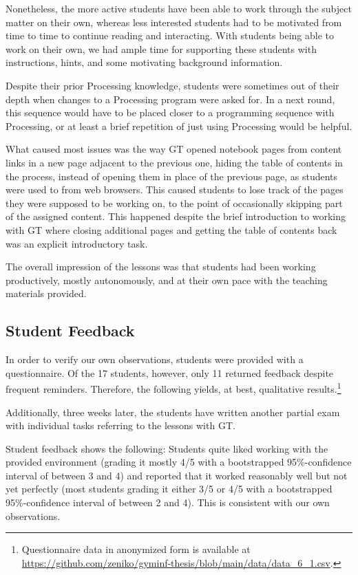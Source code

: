 Nonetheless, the more active students have been able to work through the subject matter on their own, whereas less interested students had to be motivated from time to time to continue reading and interacting. With students being able to work on their own, we had ample time for supporting these students with instructions, hints, and some motivating background information.

Despite their prior Processing knowledge, students were sometimes out of their depth when changes to a Processing program were asked for. In a next round, this sequence would have to be placed closer to a programming sequence with Processing, or at least a brief repetition of just using Processing would be helpful.

What caused most issues was the way \ac{GT} opened notebook pages from content links in a new page adjacent to the previous one, hiding the table of contents in the process, instead of opening them in place of the previous page, as students were used to from web browsers. This caused students to lose track of the pages they were supposed to be working on, to the point of occasionally skipping part of the assigned content. This happened despite the brief introduction to working with \ac{GT} where closing additional pages and getting the table of contents back was an explicit introductory task.

The overall impression of the lessons was that students had been working productively, mostly autonomously, and at their own pace with the teaching materials provided.


\subsection{Student Feedback}

In order to verify our own observations, students were provided with a questionnaire. Of the 17 students, however, only 11 returned feedback despite frequent reminders. Therefore, the following yields, at best, qualitative results.\footnote{Questionnaire data in anonymized form is available at \url{https://github.com/zeniko/gyminf-thesis/blob/main/data/data_6_1.csv}.}

Additionally, three weeks later, the students have written another partial exam with individual tasks referring to the lessons with \ac{GT}.

Student feedback shows the following: Students quite liked working with the provided environment (grading it mostly 4/5 with a bootstrapped 95\%-confidence interval of between 3 and 4) and reported that it worked reasonably well but not yet perfectly (most students grading it either 3/5 or 4/5 with a bootstrapped 95\%-confidence interval of between 2 and 4). This is consistent with our own observations.

